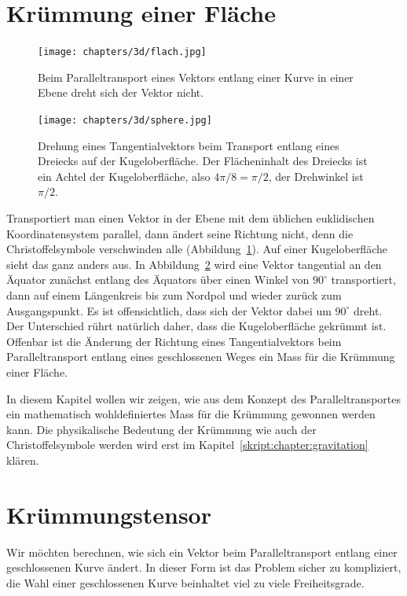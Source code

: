 %
%
%
\section{Krümmung einer Fläche%
\label{skript:kruemmung:section:kruemmung}}

\begin{figure}
\centering
\texttt{[image: chapters/3d/flach.jpg]}
\caption{Beim Paralleltransport eines Vektors entlang einer Kurve in
einer Ebene dreht sich der Vektor nicht.
\label{skript:kruemmung:transportflach}}
\end{figure}

\begin{figure}
\centering
\texttt{[image: chapters/3d/sphere.jpg]}
\caption{Drehung eines Tangentialvektors beim Transport entlang eines
Dreiecks auf der Kugeloberfläche.
Der Flächeninhalt des Dreiecks ist ein Achtel der Kugeloberfläche,
also $4\pi/8=\pi/2$, der Drehwinkel ist $\pi/2$.
\label{skript:kruemmung:transportkugel}}
\end{figure}

Transportiert man einen Vektor in der Ebene mit dem üblichen euklidischen
Koordinatensystem parallel, dann ändert seine Richtung nicht,
denn die Christoffelsymbole verschwinden alle
(Abbildung~\ref{skript:kruemmung:transportflach}).
Auf einer Kugeloberfläche sieht das ganz anders aus.
In Abbildung~\ref{skript:kruemmung:transportkugel} wird
eine Vektor tangential an den Äquator zunächst entlang 
des Äquators über einen Winkel von $90^\circ$ transportiert,
dann auf einem Längenkreis bis zum Nordpol
und wieder zurück zum Ausgangspunkt.
Es ist offensichtlich, dass sich der Vektor dabei um $90^\circ$ dreht. 
Der Unterschied rührt natürlich daher, dass die Kugeloberfläche gekrümmt
ist.
Offenbar ist die Änderung der Richtung eines Tangentialvektors beim
Paralleltransport entlang eines geschlossenen Weges ein Mass für die
Krümmung einer Fläche.

In diesem Kapitel wollen wir zeigen, wie aus dem Konzept des
Paralleltransportes ein mathematisch wohldefiniertes Mass für die
Krümmung gewonnen werden kann.
Die physikalische Bedeutung der Krümmung wie auch der Christoffelsymbole
werden wird erst im Kapitel~\ref{skript:chapter:gravitation} klären.

\section{Krümmungstensor}
Wir möchten berechnen, wie sich ein Vektor beim Paralleltransport entlang
einer geschlossenen Kurve ändert.
In dieser Form ist das Problem sicher zu kompliziert, die Wahl
einer geschlossenen Kurve beinhaltet viel zu viele Freiheitsgrade.

